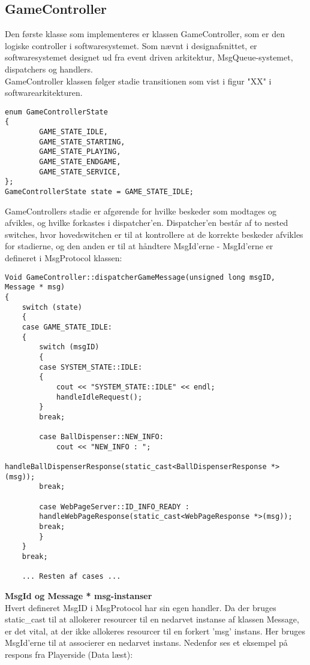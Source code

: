 \documentclass[Softwaredesign/Softwaredesign_main.tex]{subfiles}
\begin{document}
\subsection{GameController}
Den første klasse som implementeres er klassen GameController, som er den logiske controller i softwaresystemet. Som nævnt i designafsnittet, er softwaresystemet designet ud fra event driven arkitektur, MsgQueue-systemet, dispatchers og handlers. \\
GameController klassen følger stadie transitionen som vist i figur "XX" i softwarearkitekturen. 
\begin{lstlisting}[caption={Enumeration stadier for GameController}, label=list:Game_State]
enum GameControllerState
{
		GAME_STATE_IDLE,
		GAME_STATE_STARTING,
		GAME_STATE_PLAYING,
		GAME_STATE_ENDGAME,
		GAME_STATE_SERVICE,
};
GameControllerState state = GAME_STATE_IDLE;
\end{lstlisting}
GameControllers stadie er afgørende for hvilke beskeder som modtages og afvikles, og hvilke forkastes i dispatcher'en. Dispatcher'en består af to nested switches, hvor hovedswitchen er til at kontrollere at de korrekte beskeder afvikles for stadierne, og den anden er til at håndtere MsgId'erne - MsgId'erne er defineret i MsgProtocol klassen: 
\begin{lstlisting}[caption={Dispatcher for GameController}, label=list:Disp_Game]
Void GameController::dispatcherGameMessage(unsigned long msgID, Message * msg)
{
    switch (state)
	{
	case GAME_STATE_IDLE:
	{
		switch (msgID)
		{
		case SYSTEM_STATE::IDLE:
		{
			cout << "SYSTEM_STATE::IDLE" << endl;
			handleIdleRequest();
		}
		break;

		case BallDispenser::NEW_INFO:
			cout << "NEW_INFO : ";
			handleBallDispenserResponse(static_cast<BallDispenserResponse *>(msg));
		break;

		case WebPageServer::ID_INFO_READY :
		handleWebPageResponse(static_cast<WebPageResponse *>(msg));
		break;
		}
	}
	break;
	
	... Resten af cases ... 
\end{lstlisting}
\textbf{MsgId og Message * msg-instanser}\\
Hvert defineret MsgID i MsgProtocol har sin egen handler. Da der bruges static\_cast til at allokerer resourcer til en nedarvet instanse af klassen Message, er det vital, at der ikke allokeres resourcer til en forkert 'msg' instans. Her bruges MsgId'erne til at associerer en nedarvet instans. Nedenfor ses et eksempel på respons fra Playerside (Data læst): 
\end{document}

